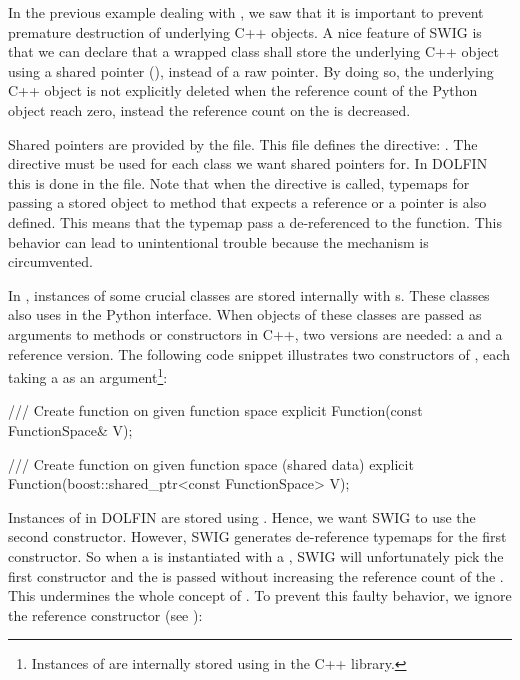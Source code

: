 
In the previous example dealing with , we saw that
it is important to prevent premature destruction of underlying C++
objects. A nice feature of SWIG is that we can declare that a wrapped
class shall store the underlying C++ object using a shared pointer
(), instead of a raw pointer. By doing so, the
underlying C++ object is not explicitly deleted when the reference
count of the Python object reach zero, instead the reference count on
the  is decreased.

Shared pointers are provided by the  file.
This file defines the directive: . The directive
must be used for each class we want shared pointers for. In DOLFIN
this is done in the  file. Note that when
the  directive is called, typemaps for passing a
 stored object to method that expects a reference or
a pointer is also defined. This means that the typemap pass a
de-referenced  to the function. This behavior can
lead to unintentional trouble because the  mechanism
is circumvented.

In \dolfin, instances of some crucial classes are stored internally
with s. These classes also uses 
in the Python interface. When objects of these classes are passed
as arguments to methods or constructors in C++, two versions are
needed: a  and a reference version. The following
code snippet illustrates two constructors of , each
taking a  as an argument\footnote{Instances of
 are internally stored using  in
the \dolfin C++ library.}:
\begin{c++}
/// Create function on given function space
explicit Function(const FunctionSpace& V);

/// Create function on given function space (shared data)
explicit Function(boost::shared_ptr<const FunctionSpace> V);
\end{c++}
Instances of  in DOLFIN are stored
using . Hence, we want SWIG to use the second
constructor. However, SWIG generates de-reference typemaps for the
first constructor. So when a  is instantiated with a
, SWIG will unfortunately pick the first constructor
and the  is passed without increasing the reference
count of the .  This undermines the whole concept
of . To prevent this faulty behavior, we ignore the
reference constructor (see ):
\begin{swigcode}
\end{swigcode}


